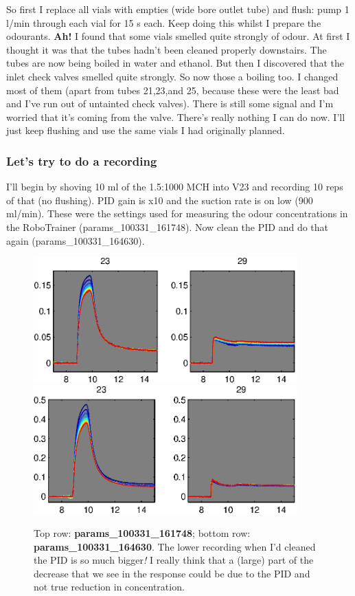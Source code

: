 \documentclass[a4paper]{report}
\begin{document}
So first I replace all vials with empties (wide bore outlet tube) and
flush: pump 1 l/min through each vial for 15 s each. Keep doing this
whilst I prepare the odourants. \textbf{Ah!} I found that some vials smelled
quite strongly of odour. At first I thought it was that the tubes
hadn't been cleaned properly downstairs. The tubes are now being
boiled in water and ethanol. But then I discovered that the inlet
check valves smelled quite strongly. So now those a boiling too. I
changed most of them (apart from tubes 21,23,and 25, because these
were the least bad and I've run out of untainted check valves). There
is still some signal and I'm worried that it's coming from the
valve. There's really nothing I can do now. I'll just keep flushing
and use the same vials I had originally planned. 


\subsubsection{Let's try to do a recording}
I'll begin by shoving 10 ml of the 1.5:1000 MCH into V23 and recording
10 reps of that (no flushing). PID gain is x10 and the suction rate is
on low (900 ml/min). These were the settings used for measuring the
odour concentrations in the RoboTrainer (params\_100331\_161748).  Now
clean the PID and do that again (params\_100331\_164630).

\begin{figure}[h]
\centering
\includegraphics[width=4in]{params_100331_161748.eps}
\includegraphics[width=4in]{params_100331_164630.eps}
\caption{Top row: \textbf{params\_100331\_161748}; bottom row:
  \textbf{params\_100331\_164630}. The lower recording when I'd
  cleaned the PID is so much bigger\textit{!} I really think that a
  (large) part of the decrease that we see in the response could be
  due to the PID and not true reduction in concentration. }
\end{figure}
\end{document}
